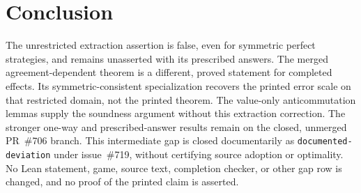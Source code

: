 \documentclass[11pt]{article}
\begin{document}
\section{Conclusion}

The unrestricted extraction assertion is false, even for symmetric perfect
strategies, and remains unasserted with its prescribed answers. The merged
agreement-dependent theorem is a different, proved statement for completed
effects. Its symmetric-consistent specialization recovers the printed error
scale on that restricted domain, not the printed theorem. The value-only
anticommutation lemmas supply the soundness argument without this extraction
correction. The stronger one-way and prescribed-answer results remain on the
closed, unmerged PR~\#706 branch. This intermediate gap is closed
documentarily as \texttt{documented-deviation} under issue~\#719, without
certifying source adoption or optimality. No Lean statement, game, source
text, completion checker, or other gap row is changed, and no proof of the
printed claim is asserted.



\end{document}

